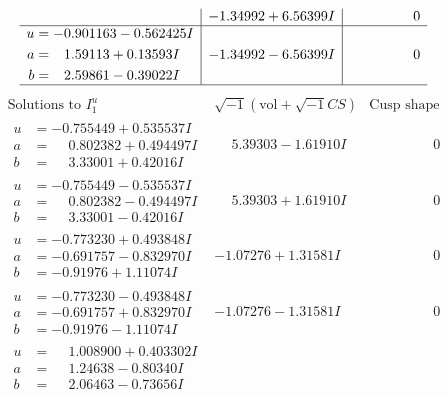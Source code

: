 \documentclass[1p]{elsarticle_modified}
\theoremstyle{definition}
\newcommand{\I}{\sqrt{-1}}
\begin{document}
$$\begin{array}{c|c|c}
 & -1.34992 + 6.56399 I & \phantom{-0.000000 } 0 \\ \hline\begin{aligned}
u &= -0.901163 - 0.562425 I \\
a &= \phantom{-}1.59113 + 0.13593 I \\
b &= \phantom{-}2.59861 - 0.39022 I\end{aligned}
 & -1.34992 - 6.56399 I & \phantom{-0.000000 } 0\\
 \hline 
 \end{array}$$\newpage$$\begin{array}{c|c|c}  
\text{Solutions to }I^u_{1}& \I (\text{vol} + \sqrt{-1}CS) & \text{Cusp shape}\\
 \hline 
\begin{aligned}
u &= -0.755449 + 0.535537 I \\
a &= \phantom{-}0.802382 + 0.494497 I \\
b &= \phantom{-}3.33001 + 0.42016 I\end{aligned}
 & \phantom{-}5.39303 - 1.61910 I & \phantom{-0.000000 } 0 \\ \hline\begin{aligned}
u &= -0.755449 - 0.535537 I \\
a &= \phantom{-}0.802382 - 0.494497 I \\
b &= \phantom{-}3.33001 - 0.42016 I\end{aligned}
 & \phantom{-}5.39303 + 1.61910 I & \phantom{-0.000000 } 0 \\ \hline\begin{aligned}
u &= -0.773230 + 0.493848 I \\
a &= -0.691757 - 0.832970 I \\
b &= -0.91976 + 1.11074 I\end{aligned}
 & -1.07276 + 1.31581 I & \phantom{-0.000000 } 0 \\ \hline\begin{aligned}
u &= -0.773230 - 0.493848 I \\
a &= -0.691757 + 0.832970 I \\
b &= -0.91976 - 1.11074 I\end{aligned}
 & -1.07276 - 1.31581 I & \phantom{-0.000000 } 0 \\ \hline\begin{aligned}
u &= \phantom{-}1.008900 + 0.403302 I \\
a &= \phantom{-}1.24638 - 0.80340 I \\
b &= \phantom{-}2.06463 - 0.73656 I\end{aligned}

\end{array}$$
\end{document}
